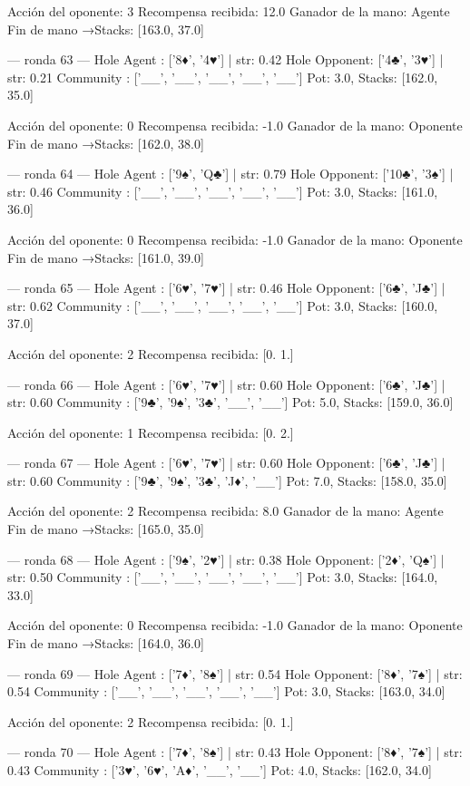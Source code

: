 Acción del oponente: 3
Recompensa recibida: 12.0
Ganador de la mano: Agente
Fin de mano →Stacks: [163.0, 37.0]


--- ronda 63 ---
Hole Agent : ['8♦', '4♥'] | str: 0.42
Hole Opponent: ['4♣', '3♥'] | str: 0.21
Community  : ['__', '__', '__', '__', '__']
Pot: 3.0, Stacks: [162.0, 35.0]

Acción del oponente: 0
Recompensa recibida: -1.0
Ganador de la mano: Oponente
Fin de mano →Stacks: [162.0, 38.0]


--- ronda 64 ---
Hole Agent : ['9♠', 'Q♣'] | str: 0.79
Hole Opponent: ['10♣', '3♠'] | str: 0.46
Community  : ['__', '__', '__', '__', '__']
Pot: 3.0, Stacks: [161.0, 36.0]

Acción del oponente: 0
Recompensa recibida: -1.0
Ganador de la mano: Oponente
Fin de mano →Stacks: [161.0, 39.0]


--- ronda 65 ---
Hole Agent : ['6♥', '7♥'] | str: 0.46
Hole Opponent: ['6♣', 'J♣'] | str: 0.62
Community  : ['__', '__', '__', '__', '__']
Pot: 3.0, Stacks: [160.0, 37.0]

Acción del oponente: 2
Recompensa recibida: [0. 1.]

--- ronda 66 ---
Hole Agent : ['6♥', '7♥'] | str: 0.60
Hole Opponent: ['6♣', 'J♣'] | str: 0.60
Community  : ['9♣', '9♠', '3♣', '__', '__']
Pot: 5.0, Stacks: [159.0, 36.0]

Acción del oponente: 1
Recompensa recibida: [0. 2.]

--- ronda 67 ---
Hole Agent : ['6♥', '7♥'] | str: 0.60
Hole Opponent: ['6♣', 'J♣'] | str: 0.60
Community  : ['9♣', '9♠', '3♣', 'J♦', '__']
Pot: 7.0, Stacks: [158.0, 35.0]

Acción del oponente: 2
Recompensa recibida: 8.0
Ganador de la mano: Agente
Fin de mano →Stacks: [165.0, 35.0]


--- ronda 68 ---
Hole Agent : ['9♠', '2♥'] | str: 0.38
Hole Opponent: ['2♦', 'Q♠'] | str: 0.50
Community  : ['__', '__', '__', '__', '__']
Pot: 3.0, Stacks: [164.0, 33.0]

Acción del oponente: 0
Recompensa recibida: -1.0
Ganador de la mano: Oponente
Fin de mano →Stacks: [164.0, 36.0]


--- ronda 69 ---
Hole Agent : ['7♦', '8♠'] | str: 0.54
Hole Opponent: ['8♦', '7♠'] | str: 0.54
Community  : ['__', '__', '__', '__', '__']
Pot: 3.0, Stacks: [163.0, 34.0]

Acción del oponente: 2
Recompensa recibida: [0. 1.]

--- ronda 70 ---
Hole Agent : ['7♦', '8♠'] | str: 0.43
Hole Opponent: ['8♦', '7♠'] | str: 0.43
Community  : ['3♥', '6♥', 'A♦', '__', '__']
Pot: 4.0, Stacks: [162.0, 34.0]

